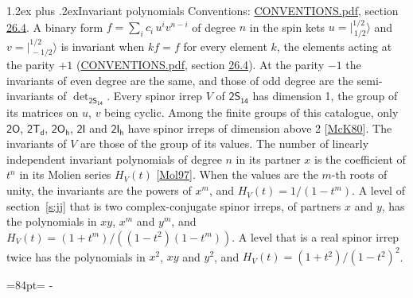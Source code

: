 \documentclass[10pt,a4paper]{article}
\makeatletter
\renewcommand\section{\@startsection{section}{1}{\z@}{-3ex plus -1ex minus -.2ex}%
  {1.2ex plus .2ex}{\normalfont\large\sffamily\bfseries\color{parttitle}}}
\newcommand{\needspace}[1]{\par\penalty-100\begingroup\dimen0=#1\relax\dimen2=\pagegoal
  \advance\dimen2-\pagetotal\ifdim\dimen0>\dimen2\relax\ifdim\dimen2>0pt\vfil\break\fi\fi
  \endgroup}
\numberwithin{equation}{section}
\newcommand{\grp}[1]{\mathsf{#1}}
\newcommand{\jm}[2]{\bigl\lvert{}^{#1}_{\,#2}\bigr\rangle}
\makeatother
\begin{document}
\section{Invariant polynomials}\label{s:invariants}
Conventions: \href{../../CONVENTIONS.pdf}{CONVENTIONS.pdf}, section \href{../../CONVENTIONS.pdf\#conv.26.4}{26.4}.
\leavevmode\label{n:local.binary.form}A binary form $f = \sum_i c_i\, u^i v^{n-i}$ of degree $n$ in the spin kets $u = \jm{1/2}{1/2}$ and $v = \jm{1/2}{-1/2}$ is invariant when $k f = f$ for every element $k$, the elements acting at the parity $+1$ (\href{../../CONVENTIONS.pdf}{CONVENTIONS.pdf}, section \href{../../CONVENTIONS.pdf\#conv.26.4}{26.4}). At the parity $-1$ the invariants of even degree are the same, and those of odd degree are the semi-invariants of $\det_{\grp{2S_{14}}}$.
\leavevmode\label{n:function.hilbert}Every spinor irrep $V$ of $\grp{2S_{14}}$ has dimension 1, the group of its matrices on $u$, $v$ being cyclic. Among the finite groups of this catalogue, only $\grp{2O}$, $\grp{2T_{d}}$, $\grp{2O_{h}}$, $\grp{2I}$ and $\grp{2I_{h}}$ have spinor irreps of dimension above 2 [\href{../../../REFERENCES.pdf\#ref.McK80}{McK80}]. The invariants of $V$ are those of the group of its values. \label{n:local.partner.x}The number of linearly independent invariant polynomials of degree $n$ in its partner $x$ is the coefficient of $t^n$ in its Molien series $H_V(t)$ [\href{../../../REFERENCES.pdf\#ref.Mol97}{Mol97}]. When the values are the $m$-th roots of unity, the invariants are the powers of $x^{m}$, and $H_V(t) = 1/(1 - t^{m})$. A level of section~\ref{s:jj} that is two complex-conjugate spinor irreps, of partners $x$ and $y$, has the polynomials in $xy$, $x^{m}$ and $y^{m}$, and $H_V(t) = (1 + t^{m})/((1 - t^{2})(1 - t^{m}))$. A level that is a real spinor irrep twice has the polynomials in $x^{2}$, $xy$ and $y^{2}$, and $H_V(t) = (1 + t^{2})/(1 - t^{2})^{2}$.
\needspace{84pt}
\end{document}
